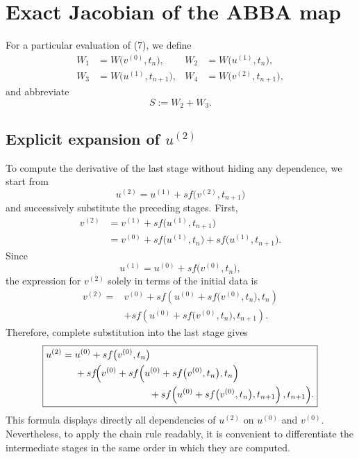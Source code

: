 \documentclass[11pt,a4paper]{article}
\begin{document}
\section{Exact Jacobian of the ABBA map}

For a particular evaluation of (7), we define
\begin{align*}
 W_1&=W\bigl(v^{(0)},t_n\bigr),
 &W_2&=W\bigl(u^{(1)},t_n\bigr),\\
 W_3&=W\bigl(u^{(1)},t_{n+1}\bigr),
 &W_4&=W\bigl(v^{(2)},t_{n+1}\bigr),
\end{align*}
and abbreviate
\[
 S:=W_2+W_3.
\]

\subsection*{Explicit expansion of \texorpdfstring{$u^{(2)}$}{u(2)}}

To compute the derivative of the last stage without hiding any dependence, we start from
\[
 u^{(2)}=u^{(1)}+s f\bigl(v^{(2)},t_{n+1}\bigr)
\]
and successively substitute the preceding stages. First,
\begin{align*}
 v^{(2)}
 &=v^{(1)}+s f\bigl(u^{(1)},t_{n+1}\bigr)\\
 &=v^{(0)}+s f\bigl(u^{(1)},t_n\bigr)
   +s f\bigl(u^{(1)},t_{n+1}\bigr).
\end{align*}
Since
\[
 u^{(1)}=u^{(0)}+s f\bigl(v^{(0)},t_n\bigr),
\]
the expression for $v^{(2)}$ solely in terms of the initial data is
\[
 \begin{aligned}
 v^{(2)}={}&v^{(0)}
 +s f\!\left(u^{(0)}+s f\bigl(v^{(0)},t_n\bigr),t_n\right)\\
 &+s f\!\left(u^{(0)}+s f\bigl(v^{(0)},t_n\bigr),t_{n+1}\right).
 \end{aligned}
\]
Therefore, complete substitution into the last stage gives
\[
 \boxed{
 \begin{aligned}
 u^{(2)}={}&u^{(0)}+s f\bigl(v^{(0)},t_n\bigr)\\
 &+s f\!\Bigl(
 v^{(0)}
 +s f\!\left(u^{(0)}+s f\bigl(v^{(0)},t_n\bigr),t_n\right)\\
 &\hspace{2.7cm}
 +s f\!\left(u^{(0)}+s f\bigl(v^{(0)},t_n\bigr),t_{n+1}\right),
 t_{n+1}\Bigr).
 \end{aligned}
 }
\]
This formula displays directly all dependencies of $u^{(2)}$ on $u^{(0)}$ and $v^{(0)}$.
Nevertheless, to apply the chain rule readably, it is convenient to differentiate the
intermediate stages in the same order in which they are computed.
\end{document}

